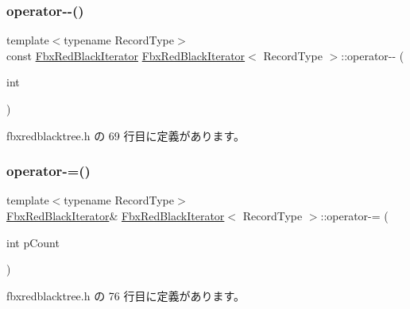 \subsubsection{\texorpdfstring{operator-\/-\/()}{operator--()}\hspace{0.1cm}{\footnotesize\ttfamily [2/2]}}
{\footnotesize\ttfamily template$<$typename Record\+Type$>$ \\
const \hyperlink{class_fbx_red_black_iterator}{Fbx\+Red\+Black\+Iterator} \hyperlink{class_fbx_red_black_iterator}{Fbx\+Red\+Black\+Iterator}$<$ Record\+Type $>$\+::operator-\/-\/ (\begin{DoxyParamCaption}\item[{int}]{ }\end{DoxyParamCaption})\hspace{0.3cm}{\ttfamily [inline]}}



 fbxredblacktree.\+h の 69 行目に定義があります。

\mbox{\label{class_fbx_red_black_iterator_ab659f3099189e3b8f9b3c1dd12c7b6bd}} 
\subsubsection{\texorpdfstring{operator-\/=()}{operator-=()}}
{\footnotesize\ttfamily template$<$typename Record\+Type$>$ \\
\hyperlink{class_fbx_red_black_iterator}{Fbx\+Red\+Black\+Iterator}\& \hyperlink{class_fbx_red_black_iterator}{Fbx\+Red\+Black\+Iterator}$<$ Record\+Type $>$\+::operator-\/= (\begin{DoxyParamCaption}\item[{int}]{p\+Count }\end{DoxyParamCaption})\hspace{0.3cm}{\ttfamily [inline]}}



 fbxredblacktree.\+h の 76 行目に定義があります。

\mbox{\label{class_fbx_red_black_iterator_a119327d8f6cad282780ad35bc45da243}} 
